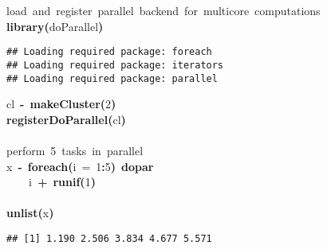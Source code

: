 \documentclass[a4paper,12pt]{article}\usepackage{graphicx, color}
\makeatletter
\newcommand{\hlnumber}[1]{\textcolor[rgb]{0,0,0}{#1}}%
\newcommand{\hlfunctioncall}[1]{\textcolor[rgb]{0.501960784313725,0,0.329411764705882}{\textbf{#1}}}%
\newcommand{\hlkeyword}[1]{\textcolor[rgb]{0,0,0}{\textbf{#1}}}%
\newcommand{\hlargument}[1]{\textcolor[rgb]{0.690196078431373,0.250980392156863,0.0196078431372549}{#1}}%
\newcommand{\hlcomment}[1]{\textcolor[rgb]{0.180392156862745,0.6,0.341176470588235}{#1}}%
\newcommand{\hlassignement}[1]{\textcolor[rgb]{0,0,0}{\textbf{#1}}}%
\newcommand{\hlsymbol}[1]{\textcolor[rgb]{0,0,0}{#1}}%
\newcommand{\hlstd}[1]{\textcolor[rgb]{0,0,0}{#1}}%
\newenvironment{kframe}{%
 \def\FrameCommand##1{\hskip\@totalleftmargin \hskip-\fboxsep
 \colorbox{shadecolor}{##1}\hskip-\fboxsep
     \hskip-\linewidth \hskip-\@totalleftmargin \hskip\columnwidth}%
 \MakeFramed {\advance\hsize-\width
   \@totalleftmargin\z@ \linewidth\hsize
   \@setminipage}}%
 {\par\unskip\endMakeFramed}
\newenvironment{knitrout}{}{} %
\renewenvironment{knitrout}{\begin{footnotesize}}{\end{footnotesize}}
\makeatother
\begin{document}
\begin{knitrout}
\color{fgcolor}\begin{kframe}
\begin{flushleft}
\ttfamily\noindent
\hlcomment{\usebox{\hlnormalsizeboxhash}{\ }load{\ }and{\ }register{\ }parallel{\ }backend{\ }for{\ }multicore{\ }computations}\hspace*{\fill}\\
\hlstd{}\hlfunctioncall{library}\hlkeyword{(}\hlsymbol{doParallel}\hlkeyword{)}\mbox{}
\normalfont
\end{flushleft}
\begin{verbatim}
## Loading required package: foreach
## Loading required package: iterators
## Loading required package: parallel
\end{verbatim}
\begin{flushleft}
\ttfamily\noindent
\hlsymbol{cl}{\ }\hlassignement{\usebox{\hlnormalsizeboxlessthan}-}{\ }\hlfunctioncall{makeCluster}\hlkeyword{(}\hlnumber{2}\hlkeyword{)}\hspace*{\fill}\\
\hlstd{}\hlfunctioncall{registerDoParallel}\hlkeyword{(}\hlsymbol{cl}\hlkeyword{)}\hspace*{\fill}\\
\hlstd{}\hspace*{\fill}\\
\hlstd{}\hlcomment{\usebox{\hlnormalsizeboxhash}{\ }perform{\ }5{\ }tasks{\ }in{\ }parallel}\hspace*{\fill}\\
\hlstd{}\hlsymbol{x}{\ }\hlassignement{\usebox{\hlnormalsizeboxlessthan}-}{\ }\hlfunctioncall{foreach}\hlkeyword{(}\hlargument{i}{\ }\hlargument{=}{\ }\hlnumber{1}\hlkeyword{:}\hlnumber{5}\hlkeyword{)}{\ }\hlkeyword{\usebox{\hlnormalsizeboxpercent}dopar\usebox{\hlnormalsizeboxpercent}}{\ }\hlkeyword{\usebox{\hlnormalsizeboxopenbrace}}\hspace*{\fill}\\
\hlstd{}{\ }{\ }{\ }{\ }\hlsymbol{i}{\ }\hlkeyword{+}{\ }\hlfunctioncall{runif}\hlkeyword{(}\hlnumber{1}\hlkeyword{)}\hspace*{\fill}\\
\hlstd{}\hlkeyword{\usebox{\hlnormalsizeboxclosebrace}}\hspace*{\fill}\\
\hlstd{}\hlfunctioncall{unlist}\hlkeyword{(}\hlsymbol{x}\hlkeyword{)}\mbox{}
\normalfont
\end{flushleft}
\begin{verbatim}
## [1] 1.190 2.506 3.834 4.677 5.571
\end{verbatim}
\end{kframe}
\end{knitrout}
\end{document}
